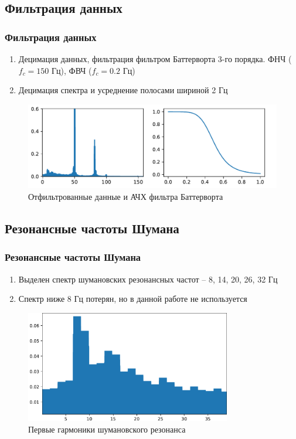\documentclass[10pt,pdf,hyperref={unicode}, dvipsnames]{beamer}
\newcommand\frametitless[1]{\subsection{#1}\frametitle{#1}}
\begin{document}
\begin{frame}[t]
	\frametitless{Фильтрация данных}
	\begin{enumerate}
		\item Децимация данных, фильтрация фильтром Баттерворта 3-го порядка. ФНЧ ($f_c=150$ Гц), ФВЧ ($f_c=0.2$ Гц)
		\item Децимация спектра и усреднение полосами шириной 2 Гц
	\end{enumerate}
	\begin{figure}[h]
		\centering
		\includegraphics[width=1\textwidth]{images/bt2.pdf}
		\caption{Отфильтрованные данные и АЧХ фильтра Баттерворта}
	\end{figure}	
\end{frame}
\begin{frame}[t]
	\frametitless{Резонансные частоты Шумана}
	\begin{enumerate}
		\item Выделен спектр шумановских резонансных частот -- 8, 14, 20, 26, 32 Гц
		\item Спектр ниже 8 Гц потерян, но в данной работе не используется
	\end{enumerate}
	\begin{figure}[h]
		\centering
		\includegraphics[width=0.8\textwidth]{images/12.pdf}
		\caption{Первые гармоники шумановского резонанса}
	\end{figure}	
\end{frame}
\end{document}
